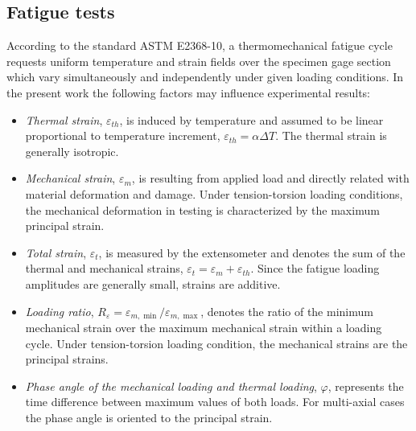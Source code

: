 \documentclass[preprint,5p,twocolumn,11pt,sort&compress]{elsarticle}
\begin{document}
\subsection{Fatigue tests}
According to the standard ASTM E2368-10, a thermomechanical fatigue cycle requests uniform temperature and strain fields over the specimen gage section which vary simultaneously and independently under given loading conditions. In the present work the following factors may influence  experimental results:
\begin{itemize}
  \item {\em Thermal strain}, $\varepsilon_{th}$, is induced by temperature and assumed to be linear proportional to temperature increment, $\varepsilon_{th}=\alpha \Delta T$. The thermal strain is generally isotropic.
  \item {\em Mechanical strain}, $\varepsilon_{m}$, is resulting from applied load and directly related with material deformation and damage. Under tension-torsion loading conditions, the mechanical deformation in testing is characterized by the maximum principal strain.
  \item {\em Total strain}, $\varepsilon_t$, is measured by the extensometer and denotes the sum of the thermal and mechanical strains, $\varepsilon_t=\varepsilon_m+\varepsilon_{th}$. Since the fatigue loading amplitudes are generally small, strains are additive.
  \item {\em Loading ratio}, $ R_{\varepsilon}=\varepsilon_{m,\min}/\varepsilon_{m,\max}$, denotes the ratio of the minimum mechanical strain over the maximum mechanical strain within a loading cycle. Under tension-torsion loading condition, the mechanical strains are the principal strains.
  \item {\em Phase angle of the mechanical loading and thermal loading}, $\varphi$, represents the time difference between maximum values of both loads. For multi-axial cases the phase angle is oriented to the principal strain.
\end{itemize}
\end{document}
